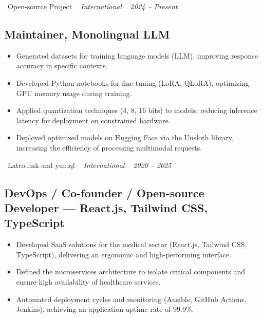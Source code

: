 \documentclass[10pt,a4paper]{article}
\begin{document}
\vspace{10pt}

\noindent\textcolor{primary}{ \faBuilding\ Open-source Project} \quad
\textit{ \small \textcolor{darkgray}{ \faMapMarker\ } International } \hfill
\textit{ \small \textcolor{darkgray}{ \faCalendar\ } 2024 -- Present }

\vspace{4pt}

\subsection*{Maintainer, Monolingual LLM}
\color{darkgray}
\begin{itemize}
  \item Generated datasets for training language models (LLM), improving response accuracy in specific contexts.
  \item Developed Python notebooks for fine-tuning (LoRA, QLoRA), optimizing GPU memory usage during training.
  \item Applied quantization techniques (4, 8, 16 bits) to models, reducing inference latency for deployment on constrained hardware.
  \item Deployed optimized models on Hugging Face via the Unsloth library, increasing the efficiency of processing multimodal requests.
\end{itemize}

\vspace{10pt}

\noindent\textcolor{primary}{ \faBuilding\ Latro.link and yuniql} \quad
\textit{ \small \textcolor{darkgray}{ \faMapMarker\ } International } \hfill
\textit{ \small \textcolor{darkgray}{ \faCalendar\ } 2020 -- 2025 }

\vspace{4pt}

\subsection*{DevOps / Co-founder / Open-source Developer --- React.js, Tailwind CSS, TypeScript}
\color{darkgray}
\begin{itemize}
  \item Developed SaaS solutions for the medical sector (React.js, Tailwind CSS, TypeScript), delivering an ergonomic and high-performing interface.
  \item Defined the microservices architecture to isolate critical components and ensure high availability of healthcare services.
  \item Automated deployment cycles and monitoring (Ansible, GitHub Actions, Jenkins), achieving an application uptime rate of 99.9\%.
\end{itemize}
\end{document}
